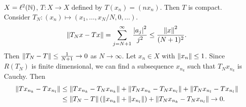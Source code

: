 \begin{example}
    $X = \ell^2(\mathbb{N})$, $T:X\to X$ defined by $T(x_n) = (nx_n)$. 
    Then $T$ is compact. Consider $T_N:(x_n)\mapsto (x_1,\ldots,x_N/N,0,\ldots)$. 
    \begin{equation*}
        \left\lVert {T_Nx - Tx} \right\rVert = \sum_{j=N+1}^\infty \frac{\left\lvert {a_j} \right\rvert^2}{j^2} 
        \leq \frac{\left\lVert {x} \right\rVert^2}{(N+1)^2}. 
    \end{equation*}
    Then $\left\lVert {T_N - T} \right\rVert\leq \frac{1}{N+1}\to 0$ as $N\to\infty$. 
    Let $x_n\in X$ with $\left\lVert {x_n} \right\rVert \leq 1$. Since $R(T_N)$ is 
    finite dimensional, we can find a subsequence $x_{n_k}$ such that 
    $T_Nx_{n_k}$ is Cauchy. Then 
    \begin{equation*}
        \begin{split}
            \norm{Tx_{n_k} - Tx_{n_l}} 
            &\leq \norm{Tx_{n_k} - T_Nx_{n_k}} + \norm{T_Nx_{n_k} - T_Nx_{n_l}} 
            + \norm{T_Nx_{n_l} - Tx_{n_l}} \\
            &\leq \norm{T_N - T}\pth{\norm{x_{n_k}} + \norm{x_{n_l}}} + \norm{T_Nx_{n_k} - T_Nx_{n_l}}\to 0. 
        \end{split}
    \end{equation*}
\end{example}

